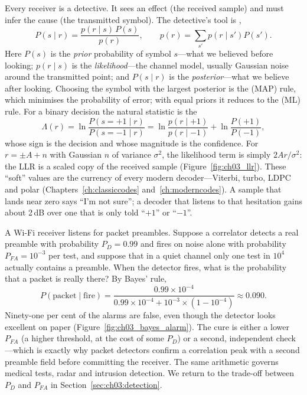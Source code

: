 Every receiver is a detective. It sees an effect (the received sample) and must infer the cause
(the transmitted symbol). The detective's tool is ,
\begin{equation}
P(s\mid r)=\frac{p(r\mid s)\,P(s)}{p(r)},\qquad p(r)=\sum_{s'}p(r\mid s')P(s').
\label{eq:ch03:bayes}
\end{equation}
Here $P(s)$ is the \emph{prior} probability of symbol $s$---what we believed before looking;
$p(r\mid s)$ is the \emph{likelihood}---the channel model, usually Gaussian noise around the
transmitted point; and $P(s\mid r)$ is the \emph{posterior}---what we believe after looking.
Choosing the symbol with the largest posterior is the  (MAP) rule, which
minimises the probability of error; with equal priors it reduces to the
 (ML) rule. For a binary decision the natural statistic is the
\begin{equation}
\Lambda(r)=\ln\frac{P(s=+1\mid r)}{P(s=-1\mid r)}=\ln\frac{p(r\mid+1)}{p(r\mid-1)}+\ln\frac{P(+1)}{P(-1)},
\label{eq:ch03:llr}
\end{equation}
whose sign is the decision and whose magnitude is the confidence. For $r=\pm A+n$ with Gaussian
$n$ of variance $\sigma^2$, the likelihood term is simply $2Ar/\sigma^2$: the LLR is a scaled copy
of the received sample (Figure~\ref{fig:ch03_llr}). These ``soft'' values are the currency of every
modern decoder---Viterbi, turbo, LDPC and polar (Chapters~\ref{ch:classiccodes}
and~\ref{ch:moderncodes}). A sample that lands near zero says ``I'm not sure''; a decoder that
listens to that hesitation gains about 2\,dB over one that is only told ``$+1$'' or ``$-1$''.


\begin{worked}
A Wi-Fi receiver listens for packet preambles. Suppose a correlator detects a real preamble with
probability $P_D=0.99$ and fires on noise alone with probability $P_{FA}=10^{-3}$ per test, and
suppose that in a quiet channel only one test in $10^4$ actually contains a preamble. When the
detector fires, what is the probability that a packet is really there? By Bayes' rule,
\[
P(\text{packet}\mid\text{fire})=\frac{0.99\times10^{-4}}{0.99\times10^{-4}+10^{-3}\times(1-10^{-4})}\approx0.090 .
\]
Ninety-one per cent of the alarms are false, even though the detector looks excellent on paper
(Figure~\ref{fig:ch03_bayes_alarm}). The cure is either a lower $P_{FA}$ (a higher threshold, at
the cost of some $P_D$) or a second, independent check---which is exactly why packet detectors
confirm a correlation peak with a second preamble field before committing the receiver. The same
arithmetic governs medical tests, radar and intrusion detection. We return to the trade-off between
$P_D$ and $P_{FA}$ in Section~\ref{sec:ch03:detection}.
\end{worked}


